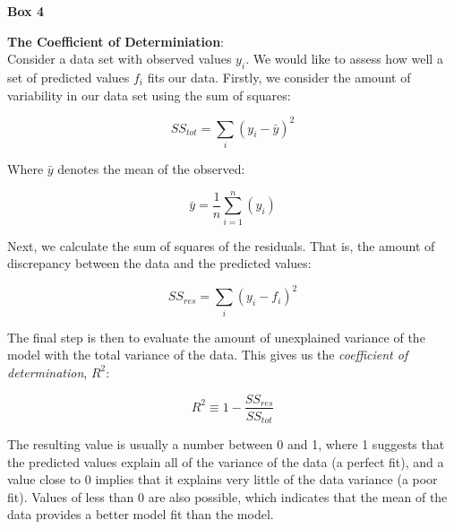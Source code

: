 \documentclass[11pt, a4paper, oneside,titlepage]{article}
\begin{document}
\newpage
\begin{framed}
{\begin{center}{\bf Box 4}\end{center}}
{\bf The Coefficient of Determiniation}:\\

Consider a data set with observed values $y_i$. We would like to assess how
well a set of predicted values $f_i$ fits our data. Firstly, we
consider the amount of variability in our data set using the sum of
squares:

\begin{equation}
  SS_{tot} = \sum\limits_{i}(y_i - \bar{y})^2
\end{equation}

Where $\bar{y}$ denotes the mean of the observed:

\begin{equation}
  \bar{y} = \frac{1}{n}\sum\limits_{i=1}^n(y_i)
\end{equation}

Next, we calculate the sum of squares of the residuals. That is, the
amount of discrepancy between the data and the predicted values:

\begin{equation}
SS_{res} = \sum\limits_{i}(y_i - f_i)^2
\end{equation}

The final step is then to evaluate the amount of unexplained variance of
the model with the total variance of the data. This gives us the
\emph{coefficient of determination}, $R^2$:

\begin{equation}
  R^2 \equiv 1 - \frac{SS_{res}}{SS_{tot}}
\end{equation}

The resulting value is usually a number between 0 and 1, where 1
suggests that the predicted values explain all of the variance of the
data (a perfect fit), and a value close to 0 implies that it explains
very little of the data
variance (a poor fit). Values of less than 0 are also possible, which indicates
that the mean of the data provides a better model fit than the model.

\end{framed}

\subsection{}
\end{document}
